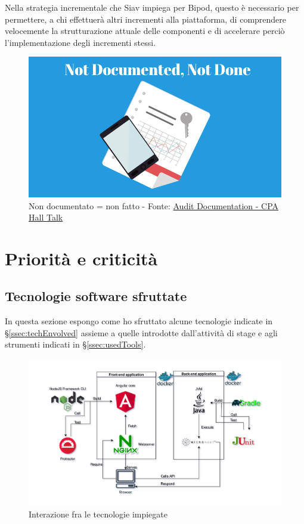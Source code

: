 Nella strategia incrementale che Siav impiega per Bipod, questo è necessario per permettere, a chi effettuerà altri incrementi alla piattaforma, di comprendere velocemente la strutturazione attuale delle componenti e di accelerare perciò l'implementazione degli incrementi stessi.
\vspace{45px}
\begin{figure}[H]
    \centering
    \includegraphics[width=0.75\columnwidth]{immagini/Not-documented-not-done.png}
    \caption{Non documentato = non fatto - Fonte: \href{https://cpahalltalk.com/audit-documentation/}{Audit Documentation - CPA Hall Talk}}
    \label{fig:notDone}
\end{figure}
\newpage
\section{Priorità e criticità}
\subsection{Tecnologie software sfruttate}
In questa sezione espongo come ho sfruttato alcune tecnologie indicate in \S\ref{ssec:techEnvolved} assieme a quelle introdotte dall'attività di stage e agli strumenti indicati in \S\ref{ssec:usedTools}.
\vspace{40pt}
\begin{figure}[H]
    \centering
    \includegraphics[width=\columnwidth]{immagini/Network scheme-2.png}
    \caption{Interazione fra le tecnologie impiegate}
    \label{fig:techInteraction}
\end{figure}
